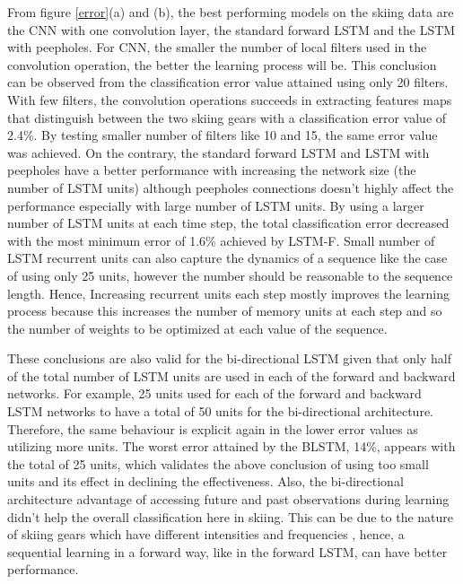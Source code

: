 \documentclass[12pt,a4paper]{article}
\begin{document}
From figure \ref{error}(a) and (b), the best performing models on the skiing data are the CNN with one convolution layer, the standard forward LSTM and the LSTM with peepholes. For CNN, the smaller the number of local filters used in the convolution operation, the better the learning process will be. This conclusion can be observed from the classification error value attained using only 20 filters. With few filters, the convolution operations succeeds in extracting features maps that distinguish between the two skiing gears with a classification error value of	2.4\%. By testing smaller number of filters like 10 and 15, the same error value was achieved. On the contrary, the standard forward LSTM and LSTM with peepholes have a better performance with increasing the network size (the number of LSTM units) although peepholes connections doesn't highly affect the performance especially with large number of LSTM units. %
 By using a larger number of LSTM units at each time step, the total classification error decreased with the most minimum error of 1.6\% achieved by LSTM-F. Small number of LSTM recurrent units can also capture the dynamics of a sequence like the case of using only 25 units, however the number should be reasonable to the sequence length. Hence, Increasing recurrent units each step mostly improves the learning process because this increases the number of memory units at each step and so the number of weights to be optimized at each value of the sequence.

These conclusions are also valid for the bi-directional LSTM given that only half of the total number of LSTM units are used in each of the forward and backward networks. For example, 25 units used for each of the forward and backward LSTM networks to have a total of 50 units for the bi-directional architecture. Therefore, the same behaviour is explicit again in the lower error values as utilizing more units. The worst error attained by the BLSTM, 14\%, appears with the total of 25 units, which validates the above conclusion of using too small units and its effect in declining the effectiveness. Also, the bi-directional architecture advantage of accessing future and past observations during learning didn't help the overall classification here in skiing. This can be due to the nature of skiing gears which have different intensities and frequencies , hence, a sequential learning in a forward way, like in the forward LSTM, can have better performance.
\end{document}
